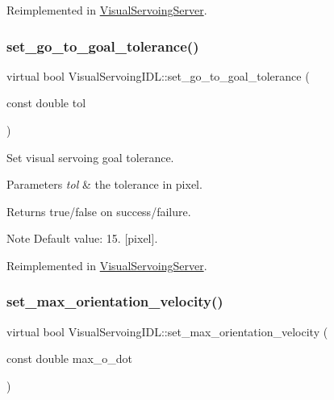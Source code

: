 Reimplemented in \hyperlink{classVisualServoingServer_a4a20a08fec9cfa4765e1245cfce5f9a8}{Visual\+Servoing\+Server}.

\mbox{\label{classVisualServoingIDL_aa465471a7300861c1f991f08eb257694}} 
\subsubsection{\texorpdfstring{set\+\_\+go\+\_\+to\+\_\+goal\+\_\+tolerance()}{set\_go\_to\_goal\_tolerance()}}
{\footnotesize\ttfamily virtual bool Visual\+Servoing\+I\+D\+L\+::set\+\_\+go\+\_\+to\+\_\+goal\+\_\+tolerance (\begin{DoxyParamCaption}\item[{const double}]{tol }\end{DoxyParamCaption})\hspace{0.3cm}{\ttfamily [virtual]}}



Set visual servoing goal tolerance. 


\begin{DoxyParams}{Parameters}
{\em tol} & the tolerance in pixel. \\
\hline
\end{DoxyParams}
\begin{DoxyReturn}{Returns}
true/false on success/failure. 
\end{DoxyReturn}
\begin{DoxyNote}{Note}
Default value\+: 15. \mbox{[}pixel\mbox{]}. 
\end{DoxyNote}


Reimplemented in \hyperlink{classVisualServoingServer_a0efdb8edb2e4b91dc3168b5051b27f56}{Visual\+Servoing\+Server}.

\mbox{\label{classVisualServoingIDL_ad2495422c8f1dda27b85db96c42a7042}} 
\subsubsection{\texorpdfstring{set\+\_\+max\+\_\+orientation\+\_\+velocity()}{set\_max\_orientation\_velocity()}}
{\footnotesize\ttfamily virtual bool Visual\+Servoing\+I\+D\+L\+::set\+\_\+max\+\_\+orientation\+\_\+velocity (\begin{DoxyParamCaption}\item[{const double}]{max\+\_\+o\+\_\+dot }\end{DoxyParamCaption})\hspace{0.3cm}{\ttfamily [virtual]}}



